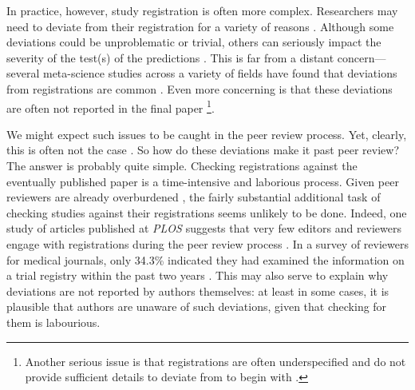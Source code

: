 \documentclass{article}
\begin{document}
In practice, however, study registration is often more complex. Researchers may need to deviate from their registration for a variety of reasons \cite[see][for a discussion on when and how researchers might consider deviating from their registration]{lakens_when_2024}. Although some deviations could be unproblematic or trivial, others can seriously impact the severity of the test(s) of the predictions \citep{lakens_when_2024}. This is far from a distant concern---several meta-science studies across a variety of fields have found that deviations from registrations are common \citep{bakker_ensuring_2020, claesen_comparing_2021, goldacre_compare_2019, hahn_cross-sectional_2025, heirene_preregistration_2024, li_systematic_2018, ofosu_pre-analysis_2023, poole_systematic_2025, targ_meta-research_group__collaborators_estimating_2023, van_den_akker_selective_2023, van_den_akker_potential_2024}. Even more concerning is that these deviations are often not reported in the final paper \citep{van_den_akker_selective_2023, van_den_akker_potential_2024, targ_meta-research_group__collaborators_estimating_2023}\footnote{Another serious issue is that registrations are often underspecified and do not provide sufficient details to deviate from to begin with \citep{bakker_ensuring_2020, hahn_cross-sectional_2025, ofosu_pre-analysis_2023, poole_systematic_2025, van_den_akker_potential_2024}.}.

We might expect such issues to be caught in the peer review process. Yet, clearly, this is often not the case \citep{van_den_akker_potential_2024}. So how do these deviations make it past peer review? The answer is probably quite simple. Checking registrations against the eventually published paper is a time-intensive and laborious process. Given peer reviewers are already overburdened \citep{adam_peer-review_2025}, the fairly substantial additional task of checking studies against their registrations seems unlikely to be done. Indeed, one study of articles published at \textit{PLOS} suggests that very few editors and reviewers engage with registrations during the peer review process \citep[see also \citeauthor{spitzer_registered_2023}, \citeyear{spitzer_stage_2023}]{syed_data_2025}. In a survey of reviewers for medical journals, only 34.3\% indicated they had examined the information on a trial registry within the past two years \citep{mathieu_use_2013}. This may also serve to explain why deviations are not reported by authors themselves: at least in some cases, it is plausible that authors are unaware of such deviations, given that checking for them is labourious.
\end{document}
